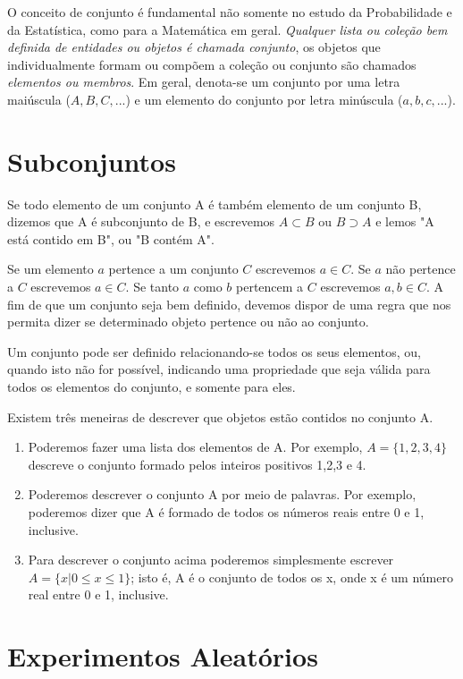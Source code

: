 O conceito de conjunto é fundamental não somente no estudo da
Probabilidade e da Estatística, como para a Matemática em geral.
\emph{Qualquer lista ou coleção bem definida de entidades ou
objetos é chamada conjunto}, os objetos que individualmente formam
ou compõem a coleção ou conjunto são chamados \emph{elementos ou
membros}. Em geral, denota-se um conjunto por uma letra maiúscula
($A,B,C,...$) e um elemento do conjunto por letra minúscula
($a,b,c,...$).\vskip0.3cm

\section{Subconjuntos}

Se todo elemento de um conjunto A é também elemento de um conjunto
B, dizemos que A é subconjunto de B, e escrevemos $A \subset B $
ou $B \supset A$ e lemos "A está contido em B", ou "B contém
A".\vskip0.3cm

Se um elemento $a$ pertence a um conjunto $C$ escrevemos $a \in
C$. Se $a$ não pertence a $C$ escrevemos $a \in C$. Se tanto $a$
como $b$ pertencem a $C$ escrevemos $a,b \in C$. A fim de que um
conjunto seja bem definido, devemos dispor de uma regra que nos
permita dizer se determinado objeto pertence ou não ao
conjunto.\vskip0.3cm

Um conjunto pode ser definido relacionando-se todos os seus
elementos, ou, quando isto não for possível, indicando uma
propriedade que seja válida para todos os elementos do conjunto, e
somente para eles.\vskip0.3cm


Existem três meneiras de descrever que objetos estão contidos no
conjunto A.

\begin{enumerate}
    \item Poderemos fazer uma lista dos elementos de A. Por
    exemplo, $A = \{ 1,2,3,4 \}$ descreve o conjunto formado pelos
    inteiros positivos 1,2,3 e 4.
    \item Poderemos descrever o conjunto A por meio de palavras.
    Por exemplo, poderemos dizer que A é formado de todos os
    números reais entre 0 e 1, inclusive.
    \item Para descrever o conjunto acima poderemos simplesmente
    escrever $A = \{ x|0\leq x \leq 1 \}$; isto é, A é o conjunto
    de todos os x, onde x é um número real entre 0 e 1, inclusive.
\end{enumerate}


\section{Experimentos Aleatórios}

